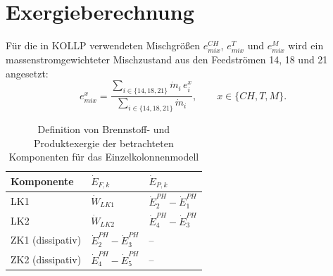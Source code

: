 \chapter{Exergieberechnung}
\label{ch:a_exergie}

Für die in KOLLP verwendeten Mischgrößen $e^{CH}_{mix}$, $e^{T}_{mix}$ und $e^{M}_{mix}$ wird ein massenstromgewichteter Mischzustand aus den Feedströmen 14, 18 und 21 angesetzt:
\[
e^{x}_{mix}
=
\frac{\sum\limits_{i\in\{14,18,21\}} \dot{m}_{i}\, e^{x}_{i}}
{\sum\limits_{i\in\{14,18,21\}} \dot{m}_{i}},
\qquad
x \in \{CH, T, M\}.
\]


\begin{landscape}
\begin{table}[p]
\centering
\caption{Definition von Brennstoff- und Produktexergie der betrachteten Komponenten für das Einzelkolonnenmodell}
\label{tab:exdef_components_single}
\begin{tabular}{lll}
\toprule
Komponente & $\dot{E}_{F,k}$ & $\dot{E}_{P,k}$ \\
\midrule
LK1 &
$\dot{W}_{LK1}$ &
$\dot{E}^{PH}_{2}-\dot{E}^{PH}_{1}$ \\

LK2 &
$\dot{W}_{LK2}$ &
$\dot{E}^{PH}_{4}-\dot{E}^{PH}_{3}$ \\

ZK1 (dissipativ) &
$\dot{E}^{PH}_{2}-\dot{E}^{PH}_{3}$ &
-- \\

ZK2 (dissipativ) &
$\dot{E}^{PH}_{4}-\dot{E}^{PH}_{5}$ &
-- \\


\end{tabular}
\end{table}
\end{landscape}
